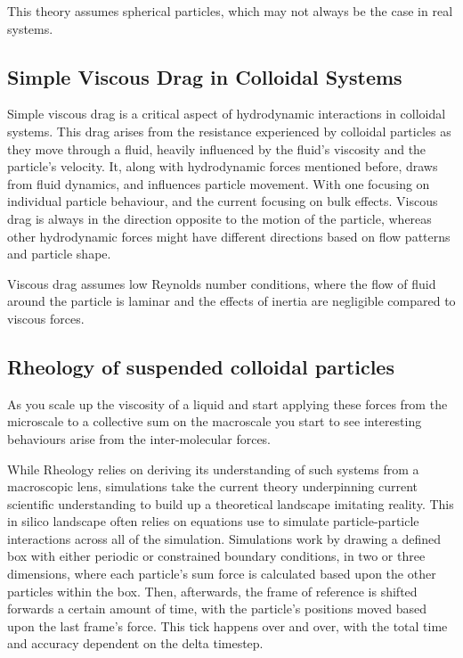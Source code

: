 This theory assumes spherical particles, which may not always be the case in real systems.

\subsection{Simple Viscous Drag in Colloidal Systems}

Simple viscous drag is a critical aspect of hydrodynamic interactions in colloidal systems. This drag arises from the resistance experienced by colloidal particles as they move through a fluid, heavily influenced by the fluid's viscosity and the particle's velocity. It, along with hydrodynamic forces mentioned before, draws from fluid dynamics, and influences particle movement. With one focusing on individual particle behaviour, and the current focusing on bulk effects. Viscous drag is always in the direction opposite to the motion of the particle, whereas other hydrodynamic forces might have different directions based on flow patterns and particle shape.

Viscous drag assumes low Reynolds number conditions, where the flow of fluid around the particle is laminar and the effects of inertia are negligible compared to viscous forces.

\subsection{Rheology of suspended colloidal particles}

As you scale up the viscosity of a liquid and start applying these forces from the microscale to a collective sum on the macroscale you start to see interesting behaviours arise from the inter-molecular forces.

While Rheology relies on deriving its understanding of such systems from a macroscopic lens, simulations take the current theory underpinning current scientific understanding to build up a theoretical landscape imitating reality. This in silico landscape often relies on equations use to simulate particle-particle interactions across all of the simulation. Simulations work by drawing a defined box with either periodic or constrained boundary conditions, in two or three dimensions, where each particle's sum force is calculated based upon the other particles within the box. Then, afterwards, the frame of reference is shifted forwards a certain amount of time, with the particle's positions moved based upon the last frame's force. This tick happens over and over, with the total time and accuracy dependent on the delta timestep.\cite{foss_brady_2000}
 
